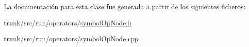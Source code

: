 La documentación para esta clase fue generada a partir de los siguientes ficheros\-:\begin{DoxyCompactItemize}
\item 
trunk/src/run/operators/\hyperlink{symbolOpNode_8h}{symbol\-Op\-Node.\-h}\item 
trunk/src/run/operators/symbol\-Op\-Node.\-cpp\end{DoxyCompactItemize}
